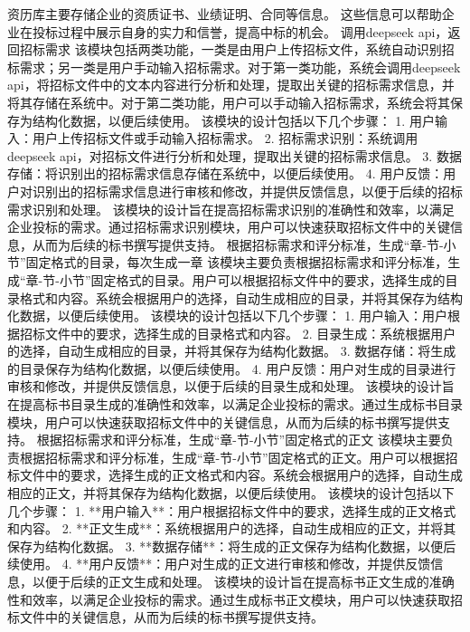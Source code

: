 \documentclass{xmu}
\begin{document}
资历库主要存储企业的资质证书、业绩证明、合同等信息。
这些信息可以帮助企业在投标过程中展示自身的实力和信誉，提高中标的机会。
调用deepseek api，返回招标需求
该模块包括两类功能，一类是由用户上传招标文件，系统自动识别招标需求；另一类是用户手动输入招标需求。对于第一类功能，系统会调用deepseek api，将招标文件中的文本内容进行分析和处理，提取出关键的招标需求信息，并将其存储在系统中。对于第二类功能，用户可以手动输入招标需求，系统会将其保存为结构化数据，以便后续使用。
该模块的设计包括以下几个步骤：
1. 用户输入：用户上传招标文件或手动输入招标需求。
2. 招标需求识别：系统调用deepseek api，对招标文件进行分析和处理，提取出关键的招标需求信息。
3. 数据存储：将识别出的招标需求信息存储在系统中，以便后续使用。
4. 用户反馈：用户对识别出的招标需求信息进行审核和修改，并提供反馈信息，以便于后续的招标需求识别和处理。
该模块的设计旨在提高招标需求识别的准确性和效率，以满足企业投标的需求。通过招标需求识别模块，用户可以快速获取招标文件中的关键信息，从而为后续的标书撰写提供支持。
根据招标需求和评分标准，生成“章-节-小节”固定格式的目录，每次生成一章
该模块主要负责根据招标需求和评分标准，生成“章-节-小节”固定格式的目录。用户可以根据招标文件中的要求，选择生成的目录格式和内容。系统会根据用户的选择，自动生成相应的目录，并将其保存为结构化数据，以便后续使用。
该模块的设计包括以下几个步骤：
1. 用户输入：用户根据招标文件中的要求，选择生成的目录格式和内容。
2. 目录生成：系统根据用户的选择，自动生成相应的目录，并将其保存为结构化数据。
3. 数据存储：将生成的目录保存为结构化数据，以便后续使用。
4. 用户反馈：用户对生成的目录进行审核和修改，并提供反馈信息，以便于后续的目录生成和处理。
该模块的设计旨在提高标书目录生成的准确性和效率，以满足企业投标的需求。通过生成标书目录模块，用户可以快速获取招标文件中的关键信息，从而为后续的标书撰写提供支持。
根据招标需求和评分标准，生成“章-节-小节”固定格式的正文
该模块主要负责根据招标需求和评分标准，生成“章-节-小节”固定格式的正文。用户可以根据招标文件中的要求，选择生成的正文格式和内容。系统会根据用户的选择，自动生成相应的正文，并将其保存为结构化数据，以便后续使用。
该模块的设计包括以下几个步骤：
1. **用户输入**：用户根据招标文件中的要求，选择生成的正文格式和内容。
2. **正文生成**：系统根据用户的选择，自动生成相应的正文，并将其保存为结构化数据。
3. **数据存储**：将生成的正文保存为结构化数据，以便后续使用。
4. **用户反馈**：用户对生成的正文进行审核和修改，并提供反馈信息，以便于后续的正文生成和处理。
该模块的设计旨在提高标书正文生成的准确性和效率，以满足企业投标的需求。通过生成标书正文模块，用户可以快速获取招标文件中的关键信息，从而为后续的标书撰写提供支持。
\end{document}
